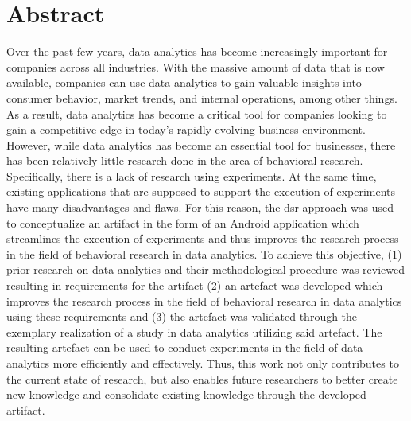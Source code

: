 \section*{Abstract}
Over the past few years, data analytics has become increasingly important for companies across all industries. With the massive amount of data that is now available, companies can use data analytics to gain valuable insights into consumer behavior, market trends, and internal operations, among other things. As a result, data analytics has become a critical tool for companies looking to gain a competitive edge in today's rapidly evolving business environment. However, while data analytics has become an essential tool for businesses, there has been relatively little research done in the area of behavioral research. %
Specifically, there is a lack of research using experiments. At the same time, existing applications that are supposed to support the execution of experiments have many disadvantages and flaws. For this reason, the \ac{dsr} approach was used to conceptualize an artifact in the form of an Android application which streamlines the execution of experiments and thus improves the research process in the field of behavioral research in data analytics. To achieve this objective, (1) prior research on data analytics and their methodological procedure was reviewed resulting in requirements for the artifact (2) an artefact was developed which improves the research process in the field of behavioral research in data analytics using these requirements and (3) the artefact was validated through the exemplary realization of a study in data analytics utilizing said artefact. The resulting artefact can be used to conduct experiments in the field of data analytics more efficiently and effectively. Thus, this work not only contributes to the current state of research, but also enables future researchers to better create new knowledge and consolidate existing knowledge through the developed artifact. %




